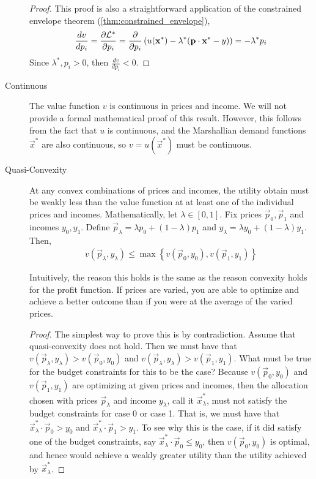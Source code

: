 \begin{description}
    \begin{proof}
        This proof is also a straightforward application of the constrained envelope theorem (\ref{thm:constrained_envelope}),
        \begin{align*}
            \frac{dv}{dp_i} = \frac{\partial\mathcal{L}^*}{\partial p_i} = \frac{\partial }{\partial p_i} \left(u(\mathbf{x}^*) - \lambda^* (\mathbf{p} \cdot \mathbf{x}^* - y)\right) = -\lambda^* p_i
        \end{align*}
        Since $\lambda^*, p_i > 0$, then $\frac{dv}{dp_i} < 0$. 
    \end{proof}
    \item[Continuous] The value function $v$ is continuous in prices and income. We will not provide a formal mathematical proof of this result. However, this follows from the fact that $u$ is continuous, and the Marshallian demand functions $\vec{x}^*$ are also continuous, so $v = u(\vec{x}^*)$ must be continuous. 
    \item[Quasi-Convexity] At any convex combinations of prices and incomes, the utility obtain must be weakly less than the value function at at least one of the individual prices and incomes. Mathematically, let $\lambda \in [0, 1]$. Fix prices $\vec{p}_0, \vec{p}_1$ and incomes $y_0, y_1$. Define $\vec{p}_\lambda = \lambda p_0 + (1 - \lambda)p_1$ and $y_\lambda = \lambda y_0 + (1 - \lambda) y_1$. Then,
    \begin{align*}
        v(\vec{p}_\lambda, y_\lambda) \leq \max\left\{v(\vec{p}_0, y_0), v(\vec{p}_1, y_1)\right\}
    \end{align*}
    
    Intuitively, the reason this holds is the same as the reason convexity holds for the profit function. If prices are varied, you are able to optimize and achieve a better outcome than if you were at the average of the varied prices.

    \begin{proof}
        The simplest way to prove this is by contradiction. Assume that quasi-convexity does not hold. Then we must have that $v(\vec{p}_\lambda, y_\lambda) > v(\vec{p}_0, y_0)$ and $v(\vec{p}_\lambda, y_\lambda) > v(\vec{p}_1, y_1)$. What must be true for the budget constraints for this to be the case? Because $v(\vec{p}_0, y_0)$ and $v(\vec{p}_1, y_1)$ are optimizing at given prices and incomes, then the allocation chosen with prices $\vec{p}_\lambda$ and income $y_\lambda$, call it $\vec{x}^*_\lambda$, must not satisfy the budget constraints for case 0 or case 1. That is, we must have that $\vec{x}^*_\lambda \cdot \vec{p}_0 > y_0$ and $\vec{x}^*_\lambda \cdot \vec{p}_1 > y_1$. To see why this is the case, if it did satisfy one of the budget constraints, say $\vec{x}^*_\lambda \cdot \vec{p}_0 \leq y_0$, then $v(\vec{p}_0, y_0)$ is optimal, and hence would achieve a weakly greater utility than the utility achieved by $\vec{x}^*_\lambda$.
        

\end{proof}
\end{description}

